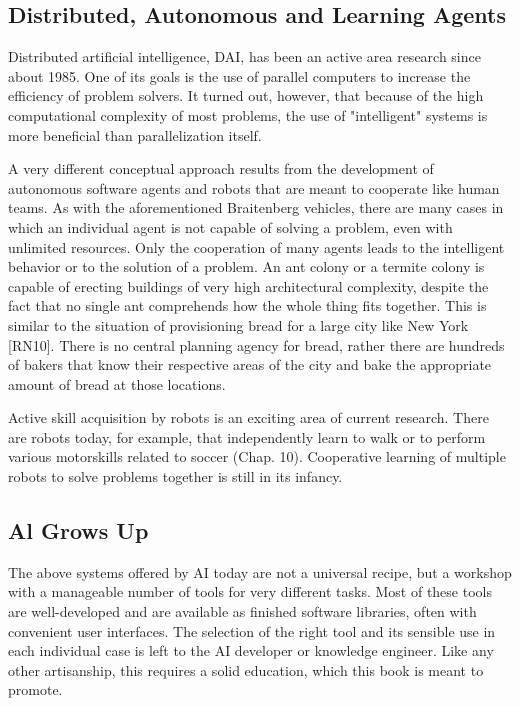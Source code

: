 \documentclass[10pt]{book}
\begin{document}
\subsection{Distributed, Autonomous and Learning Agents}
Distributed artificial intelligence, DAI, has been an active area research since about 1985. One of its goals is the use of parallel computers to increase the efficiency of problem solvers. It turned out, however, that because of the high computational complexity of most problems, the use of "intelligent" systems is more beneficial than parallelization itself.

A very different conceptual approach results from the development of autonomous software agents and robots that are meant to cooperate like human teams. As with the aforementioned Braitenberg vehicles, there are many cases in which an individual agent is not capable of solving a problem, even with unlimited resources. Only the cooperation of many agents leads to the intelligent behavior or to the solution of a problem. An ant colony or a termite colony is capable of erecting buildings of very high architectural complexity, despite the fact that no single ant comprehends how the whole thing fits together. This is similar to the situation of provisioning bread for a large city like New York [RN10]. There is no central planning agency for bread, rather there are hundreds of bakers that know their respective areas of the city and bake the appropriate amount of bread at those locations.

Active skill acquisition by robots is an exciting area of current research. There are robots today, for example, that independently learn to walk or to perform\\
various motorskills related to soccer (Chap. 10). Cooperative learning of multiple robots to solve problems together is still in its infancy.
\subsection{Al Grows Up}
The above systems offered by AI today are not a universal recipe, but a workshop with a manageable number of tools for very different tasks. Most of these tools are well-developed and are available as finished software libraries, often with convenient user interfaces. The selection of the right tool and its sensible use in each individual case is left to the AI developer or knowledge engineer. Like any other artisanship, this requires a solid education, which this book is meant to promote.
\end{document}
